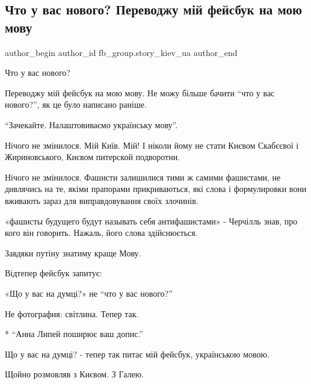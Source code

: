  
 
 
 
 
 
\subsection{Что у вас нового? Переводжу мій фейсбук на мою мову}
\label{sec:26_02_2022.fb.fb_group.story_kiev_ua.2.scho_u_vas_novogo}
 
\ifcmt
 author_begin
   author_id fb_group.story_kiev_ua
 author_end
\fi

Что у вас нового?

Переводжу мій фейсбук на мою мову. Не можу більше бачити \enquote{что у вас нового?},
як це було написано раніше.

\enquote{Зачекайте. Налаштовиваємо українську мову}.


Нічого не змінилося. Мій Київ. Мій! І ніколи йому не стати Києвом Скабєєвої і
Жириновського, Києвом питерской подворотни.

Нічого не змінилося. Фашисти залишилися тими ж самими фашистами, не дивлячись
на те, якіми прапорами прикриваються, які слова і формулировки вони вживають
зараз для виправдовування своїх злочинів. 

«фашисты будущего будут называть себя антифашистами» - Черчілль знав, про кого
він говорить. Нажаль, його слова здійснюється.

Завдяки путіну знатиму краще Мову.

Відтепер фейсбук запитує:

«Що у вас на думці?» не \enquote{что у вас нового?}

Не фотография: світлина. Тепер так.

* \enquote{Анна Липей поширює ваш допис.}

Що у вас на думці? - тепер так питає мій фейсбук, українською мовою.

Щойно розмовляв з Києвом. З Галею.

